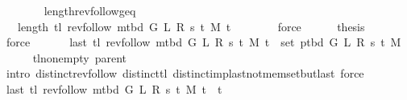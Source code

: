 \begin{isabellebody}
\ \ \ \ \ \ \isamarkupfalse%
\ length{\isacharunderscore}{\kern0pt}rev{\isacharunderscore}{\kern0pt}follow{\isacharunderscore}{\kern0pt}geq{\isacharunderscore}{\kern0pt}{}\isanewline
\ \ \ \ \ \ \isacommand{{\isachardot}{\kern0pt}}\isamarkupfalse%
\isanewline
\ \ \ \ \isamarkupfalse%
\ {\isachardoublequoteopen}{}\ {\isasymle}\ length\ {\isacharparenleft}{\kern0pt}tl\ {\isacharparenleft}{\kern0pt}rev{\isacharunderscore}{\kern0pt}follow\ {\isacharparenleft}{\kern0pt}m{\isacharunderscore}{\kern0pt}tbd\ G\ L\ R\ s\ t\ M{\isacharparenright}{\kern0pt}\ t{\isacharparenright}{\kern0pt}{\isacharparenright}{\kern0pt}{\isachardoublequoteclose}\isanewline
\ \ \ \ \ \ \isamarkupfalse%
\ force\isanewline
\ \ \ \ \isamarkupfalse%
\ {\isacharquery}{\kern0pt}thesis\isanewline
\ \ \ \ \ \ \isamarkupfalse%
\ force\isanewline
\ \ \isamarkupfalse%
\isanewline
\ \ \isamarkupfalse%
\ {\isachardoublequoteopen}last\ {\isacharparenleft}{\kern0pt}tl\ {\isacharparenleft}{\kern0pt}rev{\isacharunderscore}{\kern0pt}follow\ {\isacharparenleft}{\kern0pt}m{\isacharunderscore}{\kern0pt}tbd\ G\ L\ R\ s\ t\ M{\isacharparenright}{\kern0pt}\ t{\isacharparenright}{\kern0pt}{\isacharparenright}{\kern0pt}\ {\isasymnotin}\ set\ {\isacharparenleft}{\kern0pt}p{\isacharunderscore}{\kern0pt}tbd\ G\ L\ R\ s\ t\ M{\isacharparenright}{\kern0pt}{\isachardoublequoteclose}\isanewline
\ \ \ \ \isamarkupfalse%
\ tl{\isacharunderscore}{\kern0pt}non{\isacharunderscore}{\kern0pt}empty\ parent\isanewline
\ \ \ \ \isamarkupfalse%
\ {\isacharparenleft}{\kern0pt}intro\ distinct{\isacharunderscore}{\kern0pt}rev{\isacharunderscore}{\kern0pt}follow\ distinct{\isacharunderscore}{\kern0pt}tl\ distinct{\isacharunderscore}{\kern0pt}imp{\isacharunderscore}{\kern0pt}last{\isacharunderscore}{\kern0pt}not{\isacharunderscore}{\kern0pt}mem{\isacharunderscore}{\kern0pt}set{\isacharunderscore}{\kern0pt}butlast{\isacharparenright}{\kern0pt}\ force{\isacharplus}{\kern0pt}\isanewline
\ \ \isamarkupfalse%
\ \isamarkupfalse%
\ {\isachardoublequoteopen}last\ {\isacharparenleft}{\kern0pt}tl\ {\isacharparenleft}{\kern0pt}rev{\isacharunderscore}{\kern0pt}follow\ {\isacharparenleft}{\kern0pt}m{\isacharunderscore}{\kern0pt}tbd\ G\ L\ R\ s\ t\ M{\isacharparenright}{\kern0pt}\ t{\isacharparenright}{\kern0pt}{\isacharparenright}{\kern0pt}\ {\isacharequal}{\kern0pt}\ t{\isachardoublequoteclose}\isanewline
\ \ \isamarkupfalse%

\end{isabellebody}
